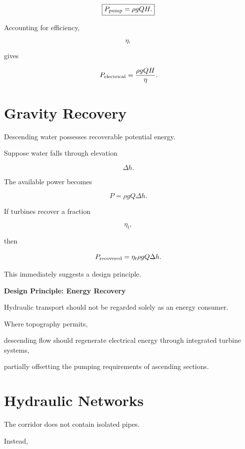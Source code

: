 \documentclass[11pt,fleqn]{book}
\numberwithin{equation}{chapter}
\newenvironment{principle}[1]
  {\begin{principleEnv}
   \noindent\textbf{Design Principle: #1}\par\smallskip\itshape}
  {\end{principleEnv}}
\theoremstyle{plain}
\theoremstyle{definition}
\theoremstyle{remark}
\begin{document}
\[
\boxed{
P_{\rm pump}
=
\rho gQH.
}
\]

Accounting for efficiency,

\[
\eta,
\]

gives

\[
P_{\rm electrical}
=
\frac{\rho gQH}{\eta}.
\]


\section{Gravity Recovery}

Descending water possesses recoverable potential energy.

Suppose water falls through elevation

\[
\Delta h.
\]

The available power becomes

\[
\boxed{
P
=
\rho gQ\Delta h.
}
\]

If turbines recover a fraction

\[
\eta_t,
\]

then

\[
P_{\rm recovered}
=
\eta_t
\rho gQ\Delta h.
\]

This immediately suggests a design principle.


\begin{principle}{Energy Recovery}

Hydraulic transport should not be regarded solely as an energy consumer.

Where topography permits,

descending flow should regenerate electrical energy through integrated
turbine systems,

partially offsetting the pumping requirements of ascending sections.

\end{principle}


\section{Hydraulic Networks}

The corridor does not contain isolated pipes.

Instead,
\end{document}
